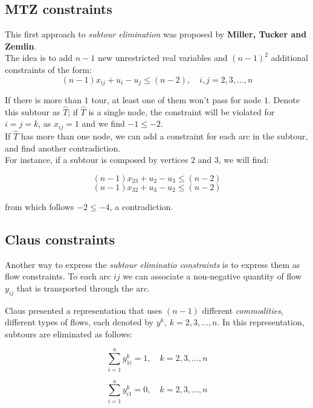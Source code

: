 \documentclass[
12pt,
a4paper,
oneside,
headinclude,
footinclude]{article}
\begin{document}
    \subsection{MTZ constraints}
    This first approach to \textit{subtour elimination} was proposed by \textbf{Miller, Tucker and Zemlin}.\\
    The idea is to add  $n-1$ new unrestricted real variables and $(n-1)^2$ additional constraints of the form:
    \begin{equation}
    {
    (n-1)x_{ij} + u_i - u_j \leq (n-2),\quad i,j = 2,3,\ldots,n
    }
    \end{equation}
    
    If there is more than $1$ tour, at least one of them won't pass for node $1$. Denote this subtour as $\hat{T}$; if $\hat{T}$ is a single node, the constraint will be violated for $i = j = k$, as $x_{ij}=1$ and we find $-1 \leq -2$. \\
    If $\hat{T}$ has more than one node, we can add a constraint for each arc in the subtour, and find another contradiction. \\
    For instance, if a subtour is composed by vertices $2$ and $3$, we will find:
    
    $$(n-1)x_{23} + u_2 - u_3 \leq (n-2)$$ 
    $$(n-1)x_{32} + u_3 - u_2 \leq (n-2)$$ 
    
    from which follows $-2 \leq -4$, a contradiction.
    
    \subsection{Claus constraints}
    Another way to express the \textit{subtour eliminatio constraints} is to express them as flow constraints. To each arc ${ij}$ we can associate a non-negative quantity of flow $y_{ij}$ that is transported through the arc. 
    
    Claus presented a representation that uses $(n-1)$ different \textit{commodities}, different types of flows, each denoted by $y^k,\ k=2,3,\ldots,n$.
    In this representation, subtours are eliminated as follows:
    
    \begin{equation}
    {
    \sum_{i=1}^n{y_{1i}^k=1},\quad k=2,3,\ldots,n
    }
    \end{equation}
    
    \begin{equation}
    {
    \sum_{i=1}^n{y_{i1}^k}=0,\quad k=2,3,\ldots,n
    }
    \end{equation}  
      
\end{document}
